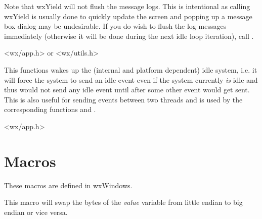 Note that wxYield will not flush the message logs. This is intentional as
calling wxYield is usually done to quickly update the screen and popping up a
message box dialog may be undesirable. If you do wish to flush the log
messages immediately (otherwise it will be done during the next idle loop
iteration), call .


<wx/app.h> or <wx/utils.h>

\label{wxwakeupidle}


This functions wakes up the (internal and platform dependent) idle system, i.e. it
will force the system to send an idle event even if the system currently {\it is}
 idle and thus would not send any idle event until after some other event would get
sent. This is also useful for sending events between two threads and is used by
the corresponding functions  and
.


<wx/app.h>

\section{Macros}\label{macros}

These macros are defined in wxWindows.

\label{intswapalways}





This macro will swap the bytes of the {\it value} variable from little
endian to big endian or vice versa.

\label{intswaponbe}



